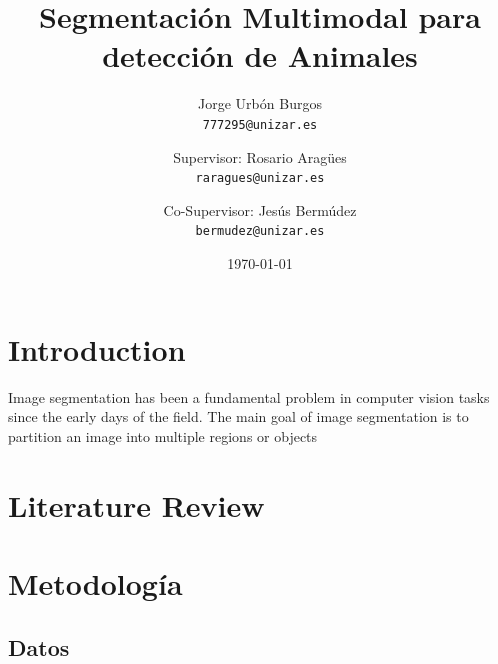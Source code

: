 \documentclass[12pt,a4paper]{report}
\title{Segmentación Multimodal para detección de Animales}
\author{
    Jorge Urbón Burgos \\
    \texttt{777295@unizar.es}
    \and
    Supervisor: Rosario Aragües \\
    \texttt{raragues@unizar.es}
    \and
    Co-Supervisor: Jesús Bermúdez \\
    \texttt{bermudez@unizar.es}
}
\date{\today}
\begin{document}
\maketitle

\begin{abstract}
\end{abstract}

\tableofcontents

\chapter{Introduction}
\label{chap:introduction}
Image segmentation has been a fundamental problem in computer vision tasks since the early days of the field. The main goal of image segmentation is to partition an image into multiple regions or objects

\chapter{Literature Review}
\label{chap:literature_review}

\chapter{Metodología}
\label{chap:methodology}
\section{Datos}
\label{sec:data}
\end{document}
